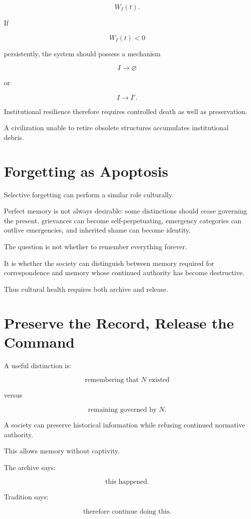 \documentclass[11pt,oneside]{book}
\theoremstyle{definition}
\theoremstyle{remark}
\begin{document}
\[
W_I(t).
\]

If

\[
W_I(t)<0
\]

persistently, the system should possess a mechanism

\[
I\rightarrow\varnothing
\]

or

\[
I\rightarrow I'.
\]

Institutional resilience therefore requires controlled death as well as preservation.

A civilization unable to retire obsolete structures accumulates institutional debris.

\section{Forgetting as Apoptosis}

Selective forgetting can perform a similar role culturally.

Perfect memory is not always desirable: some distinctions should cease governing the present, grievances can become self-perpetuating, emergency categories can outlive emergencies, and inherited shame can become identity.

The question is not whether to remember everything forever.

It is whether the society can distinguish between memory required for correspondence and memory whose continued authority has become destructive.

Thus cultural health requires both archive and release.

\section{Preserve the Record, Release the Command}

A useful distinction is:

\[
\text{remembering that }N\text{ existed}
\]

versus

\[
\text{remaining governed by }N.
\]

A society can preserve historical information while refusing continued normative authority.

This allows memory without captivity.

The archive says:

\[
\text{this happened}.
\]

Tradition says:

\[
\text{therefore continue doing this}.
\]
\end{document}
